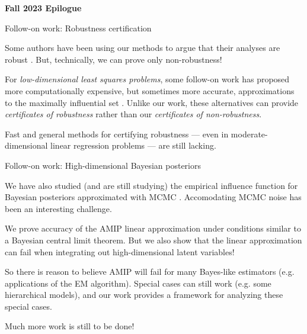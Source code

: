 

\begin{frame}{}
    \begin{center}
        {\Huge \textbf{Fall 2023 Epilogue}}
    \end{center}
\end{frame}
    
\begin{frame}{Follow-on work: Robustness certification}

    Some authors have been using our methods to argue that their analyses are
    robust \citep{eubank:2022:enfranchisement, martinez:2022:trustdictator,
    finger:2022:pesticidefreeadoption, turnbull:2022:mobilising,
    falck:2022:systematic}.  But, technically, we can prove only non-robustness!

    \vspace{1em}

    For \emph{low-dimensional least squares problems}, some follow-on work has
    proposed more computationally expensive, but sometimes more accurate,
    approximations to the maximally influential set
    \citep{moitra:2022:provablyauditingols, freund:2023:robustnessauditingols}.
%
%
    Unlike our work, these alternatives can provide \emph{certificates of
    robustness} rather than our \emph{certificates of non-robustness}.

    \vspace{1em}

    Fast and general methods for certifying robustness --- even 
    in moderate-dimensional linear regression problems --- are still lacking.    

\end{frame}    

\begin{frame}{Follow-on work: High-dimensional Bayesian posteriors}

    \vspace{1em}
    We have also studied (and are still studying) the empirical influence
    function for Bayesian posteriors approximated with MCMC
    \citep{giordano:2023:bayesij}. Accomodating MCMC noise has been an
    interesting challenge.

    \vspace{1em}

    We prove accuracy of the AMIP linear approximation under conditions similar
    to a Bayesian central limit theorem.  
    But we also show that the linear approximation can fail when
    integrating out high-dimensional latent variables!

    \vspace{1em}

    So there is reason to believe AMIP will fail for many Bayes-like estimators
    (e.g. applications of the EM algorithm).  
    Special cases can still work (e.g. some hierarchical models), and our work
    provides a framework for analyzing these special cases.  

    \vspace{1em}

    Much more work is still to be done!

\end{frame}    



